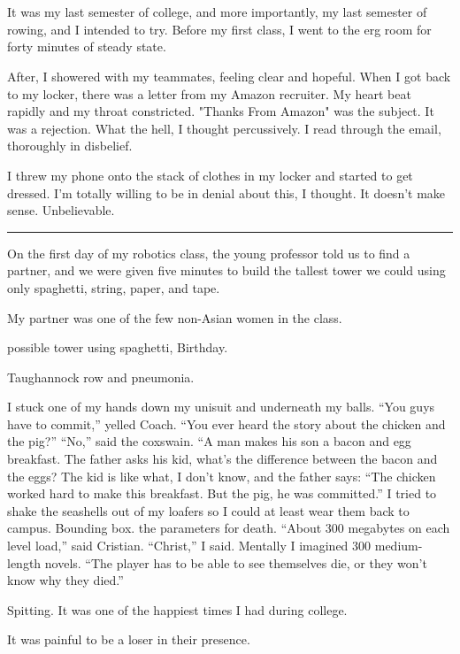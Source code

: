 \section{}

It was my last semester of college, and more importantly, my last semester of
rowing, and I intended to try.  Before my first class, I went to the erg room
for forty minutes of steady state. 

After, I showered with my teammates, feeling clear and hopeful.  When I got back
to my locker, there was a letter from my Amazon recruiter.  My heart beat
rapidly and my throat constricted.  "Thanks From Amazon" was the subject.  It
was a rejection.  What the hell, I thought percussively.  I read through the
email, thoroughly in disbelief.

I threw my phone onto the stack of clothes in my locker and started to get
dressed.  I'm totally willing to be in denial about this, I thought.  It doesn't
make sense.  Unbelievable.

\fancybreak{***}

On the first day of my robotics class, the young professor told us to find a
partner, and we were given five minutes to build the tallest tower we could
using only spaghetti, string, paper, and tape.

My partner was one of the few non-Asian women in the class.

possible tower using spaghetti, 
Birthday.

Taughannock row and pneumonia.

I stuck one of my hands down my unisuit and underneath my balls.  ``You guys
have to commit,'' yelled Coach.  ``You ever heard the story about the chicken and
the pig?'' ``No,'' said the coxswain.  ``A man makes his son a bacon and egg
breakfast.  The father asks his kid, what's the difference between the bacon
and the eggs?  The kid is like what, I don't know, and the father says: ``The
chicken worked hard to make this breakfast.  But the pig, he was committed.'' I
tried to shake the seashells out of my loafers so I could at least wear them
back to campus.  Bounding box.  the parameters for death.  ``About 300 megabytes
on each level load,'' said Cristian.  ``Christ,'' I said.  Mentally I imagined 300
medium-length novels.  ``The player has to be able to see themselves die, or
they won't know why they died.'' 

	Spitting.  It was one of the happiest times I had during college.
	

It was painful to be a loser in their presence.  

